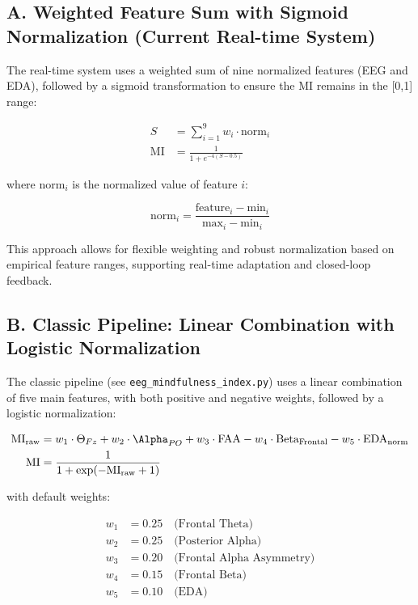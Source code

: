 \subsection*{A. Weighted Feature Sum with Sigmoid Normalization (Current Real-time System)}
The real-time system uses a weighted sum of nine normalized features (EEG and EDA), followed by a sigmoid transformation to ensure the MI remains in the [0,1] range:

\begin{align}
    S &= \sum_{i=1}^9 w_i \cdot \text{norm}_i \\
    \text{MI} &= \frac{1}{1 + e^{-4(S - 0.5)}}
\end{align}

where $\text{norm}_i$ is the normalized value of feature $i$:

\begin{equation}
    \text{norm}_i = \frac{\text{feature}_i - \text{min}_i}{\text{max}_i - \text{min}_i}
\end{equation}

This approach allows for flexible weighting and robust normalization based on empirical feature ranges, supporting real-time adaptation and closed-loop feedback.

\subsection*{B. Classic Pipeline: Linear Combination with Logistic Normalization}
The classic pipeline (see \texttt{eeg\_mindfulness\_index.py}) uses a linear combination of five main features, with both positive and negative weights, followed by a logistic normalization:

\begin{align}
    \text{MI}_{\text{raw}} &= w_1 \cdot \Theta_{Fz} + w_2 \cdot \Alpha_{PO} + w_3 \cdot \text{FAA} - w_4 \cdot \text{Beta}_{\text{Frontal}} - w_5 \cdot \text{EDA}_{\text{norm}} \\
    \text{MI} &= \frac{1}{1 + \exp(-\text{MI}_{\text{raw}} + 1)}
\end{align}

with default weights:

\begin{align*}
    w_1 &= 0.25 \quad \text{(Frontal Theta)} \\
    w_2 &= 0.25 \quad \text{(Posterior Alpha)} \\
    w_3 &= 0.20 \quad \text{(Frontal Alpha Asymmetry)} \\
    w_4 &= 0.15 \quad \text{(Frontal Beta)} \\
    w_5 &= 0.10 \quad \text{(EDA)}
\end{align*}

